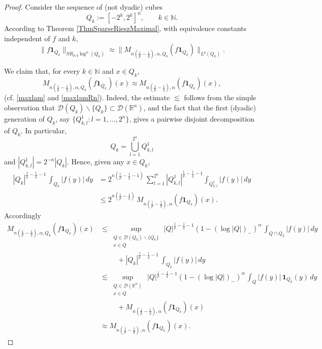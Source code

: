 \documentclass[10pt,a4paper]{amsart}
\begin{document}
\begin{proof}
Consider the sequence of (not dyadic) cubes
\[
Q_{k} := [-2^{k}, 2^{k}]^{n}, \qquad k \in\mathbb{N}.
\]
According to Theorem \ref{ThmSparseRieszMaximal}, with equivalence constants
independent of $f$ and $k$,
\begin{equation}
\label{FatouMax0}\|f \mathbf{1}_{Q_{k}}\|_{SR_{p, q} \log^{\alpha}(Q_{k})}
\approx\|M_{n (\frac{1}{p} -\frac{1}{q}), \alpha, Q_{k}} (f \mathbf{1}_{Q_{k}%
})\|_{L^{q}(Q_{k})}.
\end{equation}


We claim that, for every $k\in\mathbb{N}$ and $x\in Q_{k}$,
\begin{equation}
M_{n(\frac{1}{p}-\frac{1}{q}),\alpha,Q_{k}}(f\mathbf{1}_{Q_{k}})(x)\approx
M_{n(\frac{1}{p}-\frac{1}{q}),\alpha}(f\mathbf{1}_{Q_{k}})(x),
\label{CorSparSobProof1}%
\end{equation}
(cf. \eqref{maxlam} and \eqref{maxlamRn}). Indeed, the estimate $\lesssim$
follows from the simple observation that $\mathcal{D}(Q_{k})\backslash
\{Q_{k}\}\subset\mathcal{D}(\mathbb{R}^{n})$, and the fact that the first
(dyadic) generation of $Q_{k}$, say $\{Q_{k,l}^{1}:l=1,\ldots,2^{n}\}$, gives
a pairwise disjoint decomposition of $Q_{k}$. In particular,
\[
Q_{k}=\bigcup_{l=1}^{2^{n}}Q_{k,l}^{1}%
\]
and $|Q_{k,l}^{1}|=2^{-n}|Q_{k}|$. Hence, given any $x\in Q_{k}$,
\begin{align*}
|Q_{k}|^{\frac{1}{p}-\frac{1}{q}-1}\,\int_{Q_{k}}|f(y)|\,dy  &  =2^{n(\frac
{1}{p}-\frac{1}{q}-1)}\,\sum_{l=1}^{2^{n}}|Q_{k,l}^{1}|^{\frac{1}{p}-\frac
{1}{q}-1}\int_{Q_{k,l}^{1}}|f(y)|\,dy\\
&  \leq2^{n(\frac{1}{p}-\frac{1}{q})}\,M_{n(\frac{1}{p}-\frac{1}{q}),\alpha
}(f\mathbf{1}_{Q_{k}})(x).
\end{align*}
Accordingly
\begin{align*}
M_{n(\frac{1}{p}-\frac{1}{q}),\alpha,Q_{k}}(f\mathbf{1}_{Q_{k}})(x)  &
\leq\sup_{\substack{Q\in\mathcal{D}(Q_{k})\backslash\{Q_{k}\}\\x\in
Q}}\,|Q|^{\frac{1}{p}-\frac{1}{q}-1}(1-(\log|Q|)_{-})^{\alpha}\,\int_{Q\cap
Q_{k}}|f(y)|\,dy\\
&  \hspace{1cm}+|Q_{k}|^{\frac{1}{p}-\frac{1}{q}-1}\,\int_{Q_{k}}|f(y)|\,dy\\
&  \lesssim\sup_{\substack{Q\in\mathcal{D}(\mathbb{R}^{n})\\x\in Q}%
}\,|Q|^{\frac{1}{p}-\frac{1}{q}-1}(1-(\log|Q|)_{-})^{\alpha}\,\int%
_{Q}|f(y)|\,\mathbf{1}_{Q_{k}}(y)\,dy\\
&  \hspace{1cm}+M_{n(\frac{1}{p}-\frac{1}{q}),\alpha}(f\mathbf{1}_{Q_{k}%
})(x)\\
&  \approx M_{n(\frac{1}{p}-\frac{1}{q}),\alpha}(f\mathbf{1}_{Q_{k}})(x).
\end{align*}



\end{proof}
\end{document}
